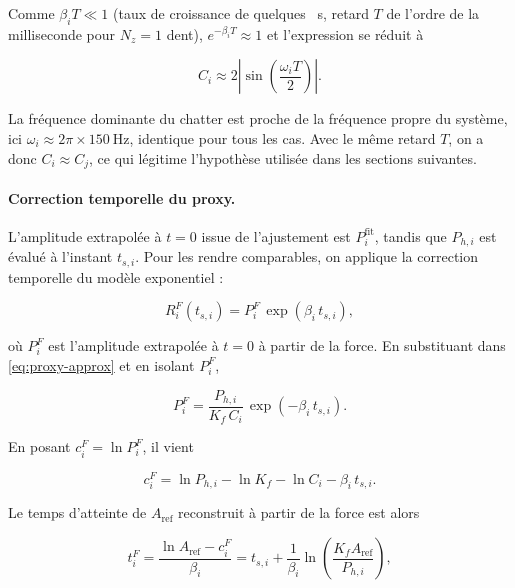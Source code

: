 \documentclass[11pt,a4paper]{article}
\newcommand{\betai}{\beta_i}                   %
\newcommand{\Pfit}{P_i^{\mathrm{fit}}}         %
\newcommand{\Pproxy}{P_{h,i}}                  %
\newcommand{\cFi}{c_i^{F}}                     %
\newcommand{\Aref}{A_{\mathrm{ref}}}           %
\newcommand{\tF}{t_i^{F}}                      %
\begin{document}
Comme \(\betai T\ll 1\) (taux de croissance de quelques \si{\per\second},
retard \(T\) de l'ordre de la milliseconde pour \(N_z=1\) dent),
\(e^{-\betai T}\approx 1\) et l'expression se réduit à

\begin{equation}
    C_i \approx 2\left|\sin\!\left(\frac{\omega_i T}{2}\right)\right|.
    \label{eq:Ci-approx}
\end{equation}

La fréquence dominante du chatter est proche de la fréquence propre du système,
ici \(\omega_i \approx 2\pi\times\SI{150}{\hertz}\), identique pour tous les
cas. Avec le même retard \(T\), on a donc \(C_i\approx C_j\), ce qui légitime
l'hypothèse utilisée dans les sections suivantes.

\paragraph{Correction temporelle du proxy.}
L'amplitude extrapolée à \(t=0\) issue de l'ajustement est \(\Pfit\), tandis que
\(\Pproxy\) est évalué à l'instant \(t_{s,i}\). Pour les rendre comparables, on
applique la correction temporelle du modèle exponentiel :

\begin{equation}
    R_i^F(t_{s,i}) = P_i^F\,\exp(\betai\,t_{s,i}),
    \label{eq:RiF-ts}
\end{equation}

où \(P_i^F\) est l'amplitude extrapolée à \(t=0\) à partir de la force. En
substituant dans \ref{eq:proxy-approx} et en isolant \(P_i^F\),

\begin{equation}
    P_i^F
    =
    \frac{\Pproxy}{K_f\,C_i}\,\exp(-\betai\,t_{s,i}).
    \label{eq:PiF}
\end{equation}

En posant \(\cFi = \ln P_i^F\), il vient

\begin{equation}
    \cFi
    =
    \ln\Pproxy - \ln K_f - \ln C_i - \betai\,t_{s,i}.
    \label{eq:cF}
\end{equation}

Le temps d'atteinte de \(\Aref\) reconstruit à partir de la force est alors

\begin{equation}
    \tF
    =
    \frac{\ln\Aref - \cFi}{\betai}
    =
    t_{s,i} + \frac{1}{\betai}\ln\!\left(\frac{K_f\Aref}{\Pproxy}\right),
    \label{eq:tF}
\end{equation}
\end{document}
